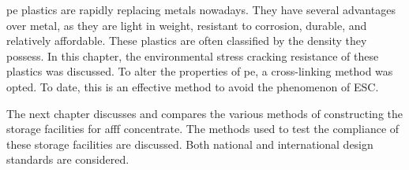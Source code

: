 \acrshort{pe} plastics are rapidly replacing metals nowadays. They have several advantages over metal, as they are light in weight, resistant to corrosion, durable, and relatively affordable. These plastics are often classified by the density they possess. In this chapter, the environmental stress cracking resistance of these plastics was discussed. To alter the properties of \acrshort{pe}, a cross-linking method was opted. To date, this is an effective method to avoid the phenomenon of ESC.

The next chapter discusses and compares the various methods of constructing the storage facilities for \acrshort{afff} concentrate. The methods used to test the compliance of these storage facilities are discussed. Both national and international design standards are considered.